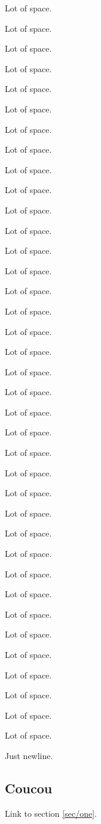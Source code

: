 \documentclass{article}
\begin{document}
Lot of space.\par
Lot of space.\par
Lot of space.\par
Lot of space.\par
Lot of space.\par
Lot of space.\par
Lot of space.\par
Lot of space.\par
Lot of space.\par
Lot of space.\par
Lot of space.\par
Lot of space.\par
Lot of space.\par
Lot of space.\par
Lot of space.\par
Lot of space.\par
Lot of space.\par
Lot of space.\par
Lot of space.\par
Lot of space.\par
Lot of space.\par
Lot of space.\par
Lot of space.\par
Lot of space.\par
Lot of space.\par
Lot of space.\par
Lot of space.\par
Lot of space.\par
Lot of space.\par
Lot of space.\par
Lot of space.\par
Lot of space.\par
Lot of space.\par
Lot of space.\par
Lot of space.\par
Lot of space.\par
Lot of space.\par

Just
newline.

\subsection{Coucou\label{sec/coucou}}
Link to section \ref{sec/one}.
\end{document}
